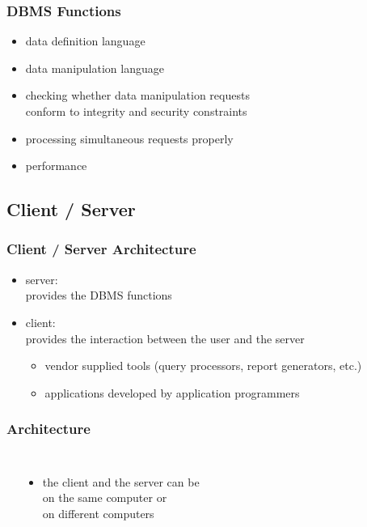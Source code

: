 \documentclass[dvipsnames]{beamer}
\theoremstyle{plain}
\begin{document}
\begin{frame}
  \frametitle{DBMS Functions}

  \begin{itemize}
    \item data definition language

    \pause
    \item data manipulation language

    \pause
    \item checking whether data manipulation requests\\
      conform to integrity and security constraints

    \pause
    \item processing simultaneous requests properly

    \pause
    \item performance
  \end{itemize}
\end{frame}

\subsection{Client / Server}

\begin{frame}
  \frametitle{Client / Server Architecture}

  \begin{itemize}
    \item \alert{server}:\\
      provides the DBMS functions

    \pause
    \bigskip
    \item \alert{client}:\\
      provides the interaction between the user and the server
    \begin{itemize}
      \item vendor supplied tools (query processors, report generators, etc.)
      \item applications developed by application programmers
    \end{itemize}
  \end{itemize}
\end{frame}

\begin{frame}
  \frametitle{Architecture}

  \begin{columns}
    \begin{center}
    \end{center}

    \begin{itemize}
      \item the client and the server can be\\
        on the same computer or\\
        on different computers
    \end{itemize}
  \end{columns}
\end{frame}
\end{document}
